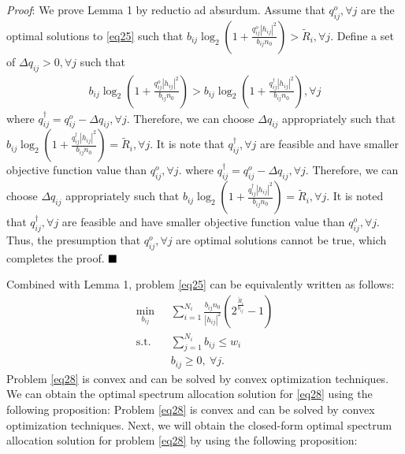 \documentclass[journal]{IEEEtran}
\begin{document}
\begin{IEEEkeywords}
\textit{Proof}:  
We prove Lemma 1 by reductio ad absurdum. Assume that $q_{ij}^o, \forall j$ are the optimal solutions to \eqref{eq25} such that $b_{ij}\log_2\left(1 + \frac{q_{ij}^o\left|h_{ij}\right|^2}{b_{ij}n_0}\right) > \tilde{R}_i, \forall j$. Define a set of $\Delta q_{ij} > 0, \forall j$ such that 
\begin{align}
b_{ij}\log_2\left(1 + \frac{q_{ij}^o\left|h_{ij}\right|^2}{b_{ij}n_0}\right) > b_{ij}\log_2\left(1 + \frac{q_{ij}^\dag\left|h_{ij}\right|^2}{b_{ij}n_0}\right), \forall j
\end{align}
where $q_{ij}^\dag = q_{ij}^o - \Delta q_{ij}, \forall j$. Therefore, we can choose $\Delta q_{ij}$ appropriately such that $b_{ij}\log_2\left(1 + \frac{q_{ij}^\dag\left|h_{ij}\right|^2}{b_{ij}n_0}\right) = \tilde{R}_i, \forall j$. It is note that $q_{ij}^\dag, \forall j$ are feasible and have smaller objective function value than $q_{ij}^o, \forall j$.
where $q_{ij}^\dag = q_{ij}^o - \Delta q_{ij}, \forall j$. Therefore, we can choose $\Delta q_{ij}$ appropriately such that $b_{ij}\log_2\left(1 + \frac{q_{ij}^\dag\left|h_{ij}\right|^2}{b_{ij}n_0}\right) = \tilde{R}_i, \forall j$. It is noted that $q_{ij}^\dag, \forall j$ are feasible and have smaller objective function value than $q_{ij}^o, \forall j$. Thus, the presumption that $q_{ij}^o, \forall j$ are optimal solutions cannot be true, which completes the proof.
$\hfill\blacksquare$

Combined with Lemma 1, problem \eqref{eq25} can be equivalently written as follows:
\begin{subequations}\label{eq28}
	\begin{align}
	\min_{b_{ij}}\ & \sum\limits_{i = 1}^{N_i} \frac{b_{ij}n_0}{\left|h_{ij}\right|^2}\left(2^{\frac{\tilde{R}_i}{b_{ij}}} - 1\right) \label{q28a} \\ \mbox{s.t.} \quad &  \sum\limits_{j = 1}^{N_i} b_{ij} \leq w_i \label{q28b} \\
	& b_{ij} \geq 0, \ \forall j. \label{q14c}
	\end{align}
\end{subequations}
Problem \eqref{eq28} is convex and can be solved by convex optimization techniques. We can obtain the optimal spectrum allocation solution for \eqref{eq28} using the following proposition:
Problem \eqref{eq28} is convex and can be solved by convex optimization techniques. Next, we will obtain the closed-form optimal spectrum allocation solution for problem \eqref{eq28} by using the following proposition:


\end{IEEEkeywords}
\end{document}
